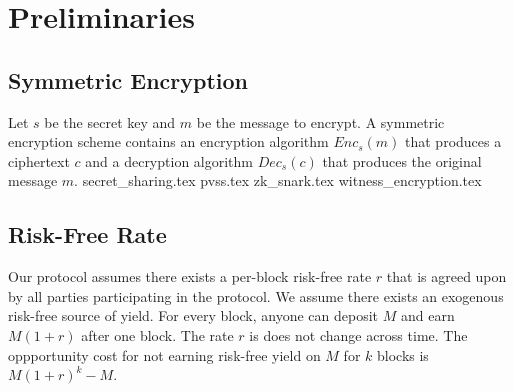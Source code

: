 \section{Preliminaries}
    \subsection{Symmetric Encryption}
    Let $s$ be the secret key and $m$ be the message to encrypt.
    A symmetric encryption scheme contains an encryption algorithm $Enc_s(m)$ that produces a ciphertext $c$ and a decryption algorithm $Dec_s(c)$ that produces the original message $m$.
    {secret_sharing.tex}
    {pvss.tex}
    {zk_snark.tex}
    {witness_encryption.tex}
    \subsection{Risk-Free Rate}
    Our protocol assumes there exists a per-block risk-free rate $r$ that is agreed upon by all parties participating in the protocol.
    We assume there exists an exogenous risk-free source of yield.
    For every block, anyone can deposit $M$ and earn $M(1 + r)$ after one block.
    The rate $r$ is does not change across time.
    The oppportunity cost for not earning risk-free yield on $M$ for $k$ blocks is $M(1 + r)^k - M$.

